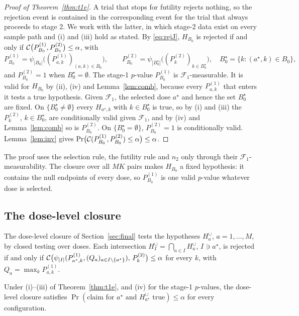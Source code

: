 \begin{appendix}
\begin{proof}[Proof of Theorem~\ref{thm:t1e}]
A trial that stops for futility rejects nothing, so the rejection event is contained in the corresponding event for the trial that always proceeds to stage 2. We work with the latter, in which stage-2 data exist on every sample path and (i) and (iii) hold as stated. By \eqref{eq:rejJ}, $H_{B_0}$ is rejected if and only if $\mathcal{C}\big(P^{(1)}_{B_0},P^{(2)}_{B_0}\big)\le\alpha$, with
\begin{equation*}
P^{(1)}_{B_0}=\psi_{|B_0|}\big((P^{(1)}_{a,k})_{(a,k)\in B_0}\big),\qquad
P^{(2)}_{B_0}=\psi_{|B_0^\star|}\big((P^{(2)}_k)_{k\in B_0^\star}\big),\quad B_0^\star=\{k:(a^\star,k)\in B_0\},
\end{equation*}
and $P^{(2)}_{B_0}=1$ when $B_0^\star=\emptyset$. The stage-1 $p$-value $P^{(1)}_{B_0}$ is $\mathcal F_1$-measurable. It is valid for $H_{B_0}$ by (ii), (iv) and Lemma~\ref{lem:comb}, because every $P^{(1)}_{a,k}$ that enters it tests a true hypothesis. Given $\mathcal F_1$, the selected dose $a^\star$ and hence the set $B_0^\star$ are fixed. On $\{B_0^\star\ne\emptyset\}$ every $H_{a^\star,k}$ with $k\in B_0^\star$ is true, so by (i) and (iii) the $P^{(2)}_k$, $k\in B_0^\star$, are conditionally valid given $\mathcal F_1$, and by (iv) and Lemma~\ref{lem:comb} so is $P^{(2)}_{B_0}$. On $\{B_0^\star=\emptyset\}$, $P^{(2)}_{B_0}=1$ is conditionally valid. Lemma~\ref{lem:inv} gives $\mathrm{Pr}\big(\mathcal{C}(P^{(1)}_{B_0},P^{(2)}_{B_0})\le\alpha\big)\le\alpha$.
\end{proof}

The proof uses the selection rule, the futility rule and $n_2$ only through their $\mathcal F_1$-measurability. The closure over all $MK$ pairs makes $H_{B_0}$ a fixed hypothesis: it contains the null endpoints of every dose, so $P^{(1)}_{B_0}$ is one valid $p$-value whatever dose is selected.

\subsection{The dose-level closure}\label{app:union}

The dose-level closure of Section~\ref{sec:final} tests the hypotheses $H^\cup_a$, $a=1,\dots,M$, by closed testing over doses. Each intersection $H^\cup_I=\bigcap_{a\in I}H^\cup_a$, $I\ni a^\star$, is rejected if and only if $\mathcal{C}\big(\psi_{|I|}(P^{(1)}_{a^\star,k},(Q_a)_{a\in I\setminus\{a^\star\}}),\,P^{(2)}_k\big)\le\alpha$ for every $k$, with $Q_a=\max_kP^{(1)}_{a,k}$.

\begin{proposition}\label{prop:union}
Under (i)--(iii) of Theorem~\ref{thm:t1e}, and (iv) for the stage-1 $p$-values, the dose-level closure satisfies $\Pr(\text{claim for }a^\star\text{ and }H^\cup_{a^\star}\text{ true})\le\alpha$ for every configuration.
\end{proposition}


\end{appendix}
